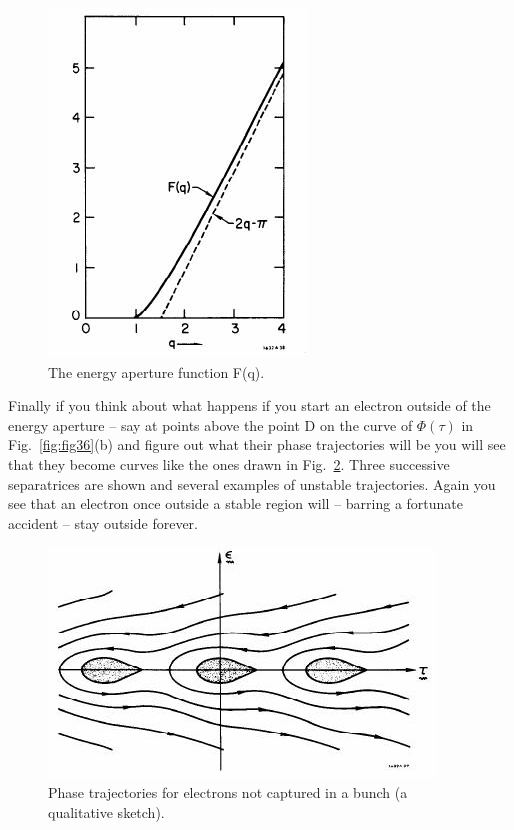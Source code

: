 \begin{figure}[!htb]
	\centering
	\includegraphics[width=0.5\linewidth]{./Figuras/fig38.jpeg}
	\caption{The energy aperture function F(q).}
	\label{fig:fig38}
\end{figure}

Finally if you think about what happens if you start an electron outside of the energy aperture
 -- say at points above the point D on the curve of $\Phi(\tau)$ in Fig.~\ref{fig:fig36}(b)
and figure out what their phase trajectories will be you will see that they become curves like the ones drawn in Fig.~\ref{fig:fig39}. Three successive separatrices are shown and several examples of unstable trajectories. Again you see that an electron once outside a stable region will -- barring a fortunate accident -- stay outside forever.

\begin{figure}[!htb]
	\centering
	\includegraphics[width=0.8\linewidth]{./Figuras/fig39.jpeg}
	\caption{Phase trajectories for electrons not captured in a bunch (a qualitative sketch).}
	\label{fig:fig39}
\end{figure}
